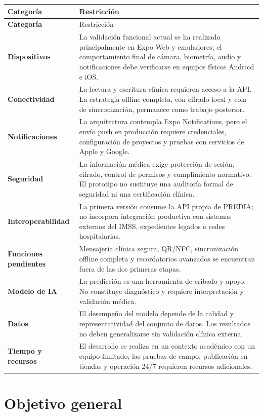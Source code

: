 \documentclass[12pt,letterpaper]{report}
\begin{document}
\begin{longtable}{>{\bfseries}p{3.6cm}p{10cm}}
\toprule
Categoría & Restricción \\
\midrule
\endfirsthead
\toprule
Categoría & Restricción \\
\midrule
\endhead
Dispositivos & La validación funcional actual se ha realizado principalmente en Expo Web y emuladores; el comportamiento final de cámara, biometría, audio y notificaciones debe verificarse en equipos físicos Android e iOS. \\
Conectividad & La lectura y escritura clínica requieren acceso a la API. La estrategia offline completa, con cifrado local y cola de sincronización, permanece como trabajo posterior. \\
Notificaciones & La arquitectura contempla Expo Notifications, pero el envío push en producción requiere credenciales, configuración de proyectos y pruebas con servicios de Apple y Google. \\
Seguridad & La información médica exige protección de sesión, cifrado, control de permisos y cumplimiento normativo. El prototipo no sustituye una auditoría formal de seguridad ni una certificación clínica. \\
Interoperabilidad & La primera versión consume la API propia de PREDIA; no incorpora integración productiva con sistemas externos del IMSS, expedientes legados o redes hospitalarias. \\
Funciones pendientes & Mensajería clínica segura, QR/NFC, sincronización offline completa y recordatorios avanzados se encuentran fuera de las dos primeras etapas. \\
Modelo de IA & La predicción es una herramienta de cribado y apoyo. No constituye diagnóstico y requiere interpretación y validación médica. \\
Datos & El desempeño del modelo depende de la calidad y representatividad del conjunto de datos. Los resultados no deben generalizarse sin validación clínica externa. \\
Tiempo y recursos & El desarrollo se realiza en un contexto académico con un equipo limitado; las pruebas de campo, publicación en tiendas y operación 24/7 requieren recursos adicionales. \\
\bottomrule
\end{longtable}

\section{Objetivo general}
\end{document}
